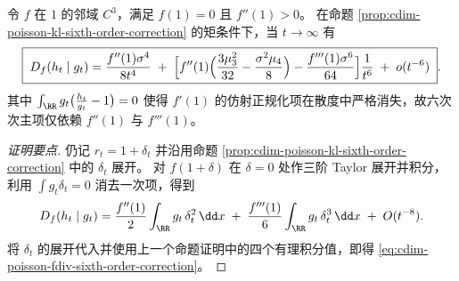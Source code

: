 \begin{proposition}\label{prop:cdim-poisson-fdiv-sixth-order-correction}
令 \(f\) 在 \(1\) 的邻域 \(C^3\)，满足 \(f(1)=0\) 且 \(f''(1)>0\)。
在命题 \ref{prop:cdim-poisson-kl-sixth-order-correction} 的矩条件下，当 \(t\to\infty\) 有
\begin{equation}\label{eq:cdim-poisson-fdiv-sixth-order-correction}
\boxed{\;
D_f(h_t\mid g_t)
=\frac{f''(1)\sigma^4}{8t^4}
\;+\;
\Bigl[
f''(1)\Bigl(\frac{3\mu_3^2}{32}-\frac{\sigma^2\mu_4}{8}\Bigr)
-\frac{f'''(1)\sigma^6}{64}
\Bigr]\frac{1}{t^6}
\;+\;o(t^{-6})\; }.
\end{equation}
其中 \(\int_{\RR}g_t\bigl(\frac{h_t}{g_t}-1\bigr)=0\) 使得 \(f'(1)\) 的仿射正规化项在散度中严格消失，故六次次主项仅依赖 \(f''(1)\) 与 \(f'''(1)\)。
\end{proposition}
\begin{proof}[证明要点]
仍记 \(r_t=1+\delta_t\) 并沿用命题 \ref{prop:cdim-poisson-kl-sixth-order-correction} 中的 \(\delta_t\) 展开。
对 \(f(1+\delta)\) 在 \(\delta=0\) 处作三阶 Taylor 展开并积分，利用 \(\int g_t\delta_t=0\) 消去一次项，得到
\[
D_f(h_t\mid g_t)
=\frac{f''(1)}{2}\int_{\RR} g_t\,\delta_t^2\,\dd x
\;+\;\frac{f'''(1)}{6}\int_{\RR} g_t\,\delta_t^3\,\dd x
\;+\;O(t^{-8}).
\]
将 \(\delta_t\) 的展开代入并使用上一个命题证明中的四个有理积分值，即得 \eqref{eq:cdim-poisson-fdiv-sixth-order-correction}。
\end{proof}

